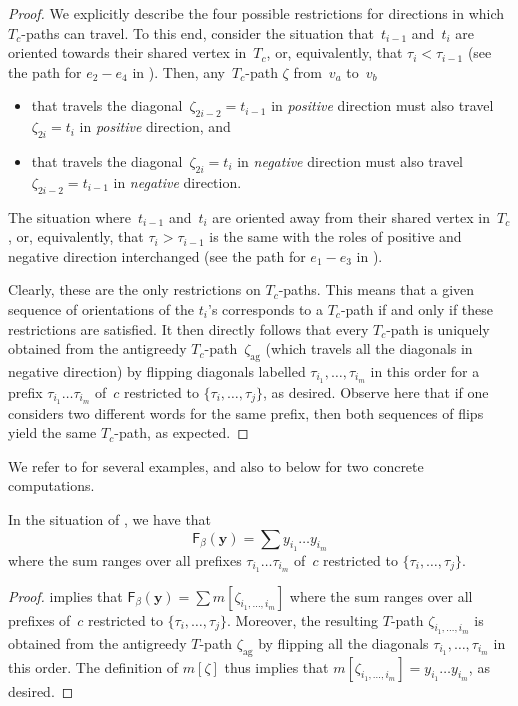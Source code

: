 \documentclass[10pt]{amsart}
\theoremstyle{definition}\newtheorem{rema}[theo]{Remark}\newtheorem{exem}[theo]{Example}
\newcommand{\y}{\mathbf{y}}
\newcommand{\Fpoly}[2]{{\mathsf{F}_{#1}(#2)}}
\newcommand{\zetaag}{{\zeta_{\operatorname{ag}}}}
\begin{document}
\begin{proof}
We explicitly describe the four possible restrictions for directions in which $T_c$-paths can travel. To this end, consider the situation that~$t_{i-1}$ and~$t_{i}$ are oriented towards their shared vertex in~$T_c$, or, equivalently, that $\tau_{i} < \tau_{i-1}$ (see the path for $e_2-e_4$ in ). Then, any~$T_c$-path $\zeta$ from~$v_a$ to~$v_b$
\begin{itemize}
\item that travels the diagonal~$\zeta_{2i-2} = t_{i-1}$ in \emph{positive} direction must also travel $\zeta_{2i} = t_{i}$ in \emph{positive} direction, and
\item that travels the diagonal~$\zeta_{2i} = t_i$ in \emph{negative} direction must also travel $\zeta_{2i-2} = t_{i-1}$ in \emph{negative} direction.
\end{itemize} The situation where~$t_{i-1}$ and~$t_{i}$ are oriented away from their shared vertex in~$T_c$, or, equivalently, that $\tau_i > \tau_{i-1}$ is the same with the roles of positive and negative direction interchanged (see the path for $e_1-e_3$ in ).

Clearly, these are the only restrictions on $T_c$-paths. This means that a given sequence of orientations of the $t_i$'s corresponds to a $T_c$-path if and only if these restrictions are satisfied. It then directly follows that every $T_c$-path is uniquely obtained from the antigreedy $T_c$-path~$\zetaag$ (which travels all the diagonals in negative direction) by flipping diagonals labelled $\tau_{i_1},\dots,\tau_{i_m}$ in this order for a prefix $\tau_{i_1} \dots \tau_{i_m}$ of~$c$ restricted to $\{\tau_i,\dots,\tau_{j}\}$, as desired. Observe here that if one considers two different words for the same prefix, then both sequences of flips yield the same $T_c$-path, as expected.
\end{proof}

We refer to  for several examples, and also to  below for two concrete computations.

\begin{coro}\label{cor:TpathAn2}
In the situation of , we have that
\[
\Fpoly{\beta}{\y} = \sum y_{i_1}\dots y_{i_m}
\]
where the sum ranges over all prefixes $\tau_{i_1} \dots \tau_{i_m}$ of~$c$ restricted to $\{\tau_i,\dots,\tau_{j}\}$.
\end{coro}

\begin{proof}
 implies that $\Fpoly{\beta}{\y} = \sum m[\zeta_{i_1,\dots,i_m}]$ where the sum ranges over all prefixes of~$c$ restricted to $\{\tau_i,\dots,\tau_j\}$. Moreover, the resulting $T$-path $\zeta_{i_1,\dots,i_m}$ is obtained from the antigreedy $T$-path $\zetaag$ by flipping all the diagonals $\tau_{i_1},\dots,\tau_{i_m}$ in this order. The definition of $m[\zeta]$ thus implies that $m[\zeta_{i_1,\dots,i_m}] = y_{i_1}\dots y_{i_m}$, as desired.
\end{proof}
\end{document}
